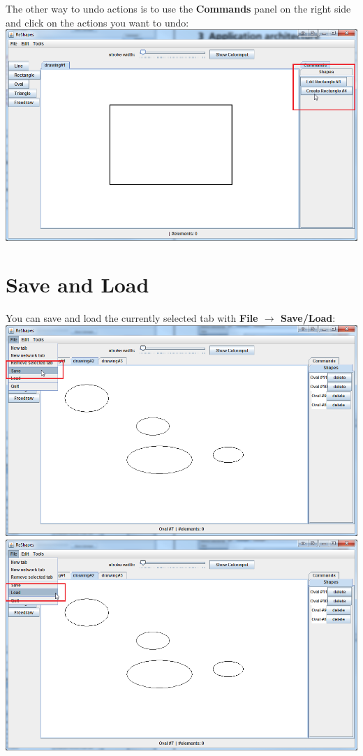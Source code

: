 The other way to undo actions is to use the \textbf{Commands} panel on the right side and click on the actions you want to undo: \\
\includegraphics[width=1\textwidth]{img/undo_action_2}

\section{Save and Load}

You can save and load the currently selected tab with \textbf{File $\rightarrow$ Save/Load}: \\
\includegraphics[width=1\textwidth]{img/save} \\
\includegraphics[width=1\textwidth]{img/load} \\

